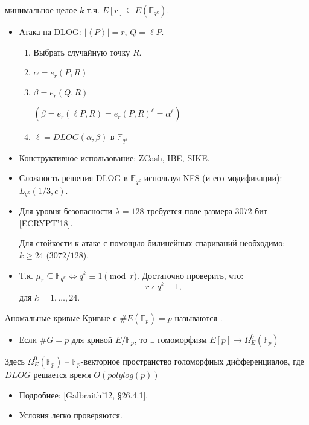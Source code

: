 \documentclass{beamer}
\begin{document}
\begin{frame}
     минимальное целое $k$ т.ч. $E[r] \subseteq E(\mathbb{F}_{q^k})$.
    
    \begin{itemize}
        \item Атака на DLOG: $|\left<P\right>| = r$, $Q = \ell P$.
        \begin{enumerate}
            \item Выбрать случайную точку $R$.
            \item $\alpha = e_r(P, R)$
            \item $\beta  = e_r(Q, R)$ \hfill 
            \begin{scriptsize}
                $(\beta = e_r(\ell P, R) = e_r(P, R)^\ell = \alpha^\ell)$
            \end{scriptsize}
            \item $\ell = DLOG(\alpha, \beta)$ в $\mathbb{F}_{q^k}$
        \end{enumerate}    
        \item Конструктивное использование: ZCash, IBE, SIKE.
    \end{itemize}
\end{frame}

\begin{frame}
\begin{itemize}
    \item Сложность решения DLOG в $\mathbb{F}_{q^k}$ используя
NFS (и его модификации): $L_{q^k}(1/3, c)$.
    \item Для уровня безопасности $\lambda = 128$ требуется поле размера $3072$-бит [ECRYPT'18].
    
    \begin{center}
        \structure{$\Downarrow$}
    \end{center}

    Для стойкости к атаке с помощью билинейных спариваний необходимо: $k \geq 24$ ($3072/128$).
    \item Т.к. $\mu_r \subseteq \mathbb{F}_{q^k} \iff q^k \equiv 1 \pmod{r}$. Достаточно проверить, что:
    \[
    r \nmid q^k - 1, 
    \]
    для $k = 1, \ldots, 24$.
\end{itemize}
\end{frame}

\begin{frame}{Аномальные кривые}
Кривые с $\#E(\mathbb{F}_p) = p$ называются .
\begin{itemize}
    \item Если $\#G = p$ для кривой $E/\mathbb{F}_p$, то $\exists$ гомоморфизм $E[p] \rightarrow \Omega^0_E(\mathbb{F}_p)$
\end{itemize}
Здесь $\Omega^0_E(\mathbb{F}_p)$ -- $\mathbb{F}_p$-векторное пространство голоморфных дифференциалов, где $DLOG$ решается время $O(polylog(p))$
\begin{itemize}
    \item Подробнее: [Galbraith'12, \S26.4.1].
    \item Условия легко проверяются.
\end{itemize}
\end{frame}
\end{document}
